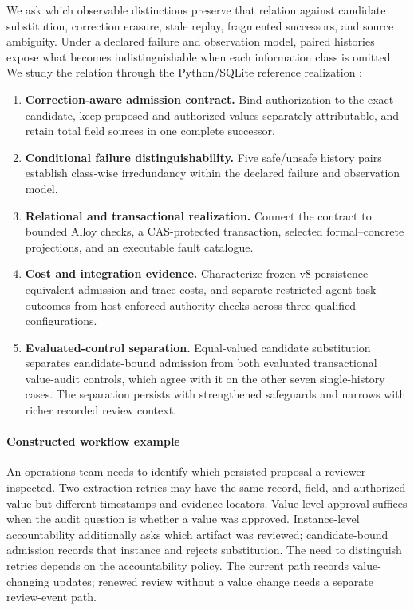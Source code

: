 We ask which observable distinctions preserve that relation against candidate substitution, correction erasure, stale replay, fragmented successors, and source ambiguity. Under a declared failure and observation model, paired histories expose what becomes indistinguishable when each information class is omitted. We study the relation through the Python/SQLite reference realization \system{}:
\begin{enumerate}[label=\textbf{C\arabic*:},leftmargin=*]
\item \textbf{Correction-aware admission contract.} Bind authorization to the exact candidate, keep proposed and authorized values separately attributable, and retain total field sources in one complete successor.
\item \textbf{Conditional failure distinguishability.} Five safe/unsafe history pairs establish class-wise irredundancy within the declared failure and observation model.
\item \textbf{Relational and transactional realization.} Connect the contract to bounded Alloy checks, a CAS-protected transaction, selected formal--concrete projections, and an executable fault catalogue.
\item \textbf{Cost and integration evidence.} Characterize frozen v8 persistence-equivalent admission and trace costs, and separate restricted-agent task outcomes from host-enforced authority checks across three qualified configurations.
\item \textbf{Evaluated-control separation.} Equal-valued candidate substitution separates candidate-bound admission from both evaluated transactional value-audit controls, which agree with it on the other seven single-history cases. The separation persists with strengthened safeguards and narrows with richer recorded review context.
\end{enumerate}

\paragraph{Constructed workflow example}
An operations team needs to identify which persisted proposal a reviewer inspected. Two extraction retries may have the same record, field, and authorized value but different timestamps and evidence locators. Value-level approval suffices when the audit question is whether a value was approved. Instance-level accountability additionally asks which artifact was reviewed; candidate-bound admission records that instance and rejects substitution. The need to distinguish retries depends on the accountability policy. The current path records value-changing updates; renewed review without a value change needs a separate review-event path.

